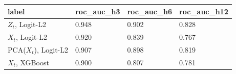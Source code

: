 \begin{tabular}{llll}
\toprule
label & roc_auc_h3 & roc_auc_h6 & roc_auc_h12 \\
\midrule
$Z_t$, Logit-L2 & 0.948 & 0.902 & 0.828 \\
$X_t$, Logit-L2 & 0.920 & 0.839 & 0.767 \\
PCA($X_t$), Logit-L2 & 0.907 & 0.898 & 0.819 \\
$X_t$, XGBoost & 0.900 & 0.807 & 0.781 \\
\bottomrule
\end{tabular}
